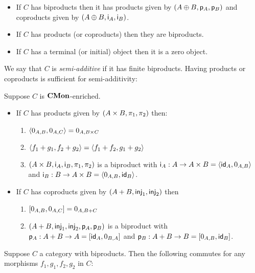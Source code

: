 \begin{proposition}
\item
\begin{itemize}
\item If $C$ has biproducts then it has products given by $(A \oplus B, \mathsf{p}_A, \mathsf{p}_B)$ and coproducts
given by $(A \oplus B, \mathsf{i}_A, \mathsf{i}_B)$.
\item If $C$ has products (or coproducts) then they are biproducts.
\item If $C$ has a terminal (or initial) object then it is a zero object.
\end{itemize}
\end{proposition}

\noindent We say that $C$ is \emph{semi-additive} if it has finite biproducts. Having products or coproducts
is sufficient for semi-additivity:

\begin{proposition}
Suppose $C$ is $\mathbf{CMon}$-enriched.
\begin{itemize}
\item If $C$ has products given by $(A \times B, \pi_1, \pi_2)$ then:
\begin{enumerate}
\item $\langle 0_{A,B}, 0_{A,C}\rangle = 0_{A,B \times C}$
\item $\langle f_1 + g_1, f_2 + g_2\rangle = \langle f_1 + f_2, g_1 + g_2\rangle$
\item $(A \times B, \mathsf{i}_A, \mathsf{i}_B, \pi_1, \pi_2)$ is a
biproduct with $\mathsf{i}_A: A \to A \times B = \langle \mathsf{id}_A, 0_{A,B}\rangle$ and $\mathsf{i}_B: B \to A \times B =
\langle 0_{A,B}, \mathsf{id}_B\rangle$.
\end{enumerate}
\item If $C$ has coproducts given by $(A + B, \mathsf{inj}_1, \mathsf{inj}_2)$ then
\begin{enumerate}
\item $[0_{A,B}, 0_{A,C}] = 0_{A,B + C}$
\item $(A + B, \mathsf{inj}_1, \mathsf{inj}_2, \mathsf{p}_A, \mathsf{p}_B)$ is a
biproduct with $\mathsf{p}_A: A + B \to A = [\mathsf{id}_A, 0_{B,A}]$ and $\mathsf{p}_B: A + B \to B =
[0_{A,B}, \mathsf{id}_B]$.
\end{enumerate}
\end{itemize}
\end{proposition}

\begin{proposition}
\label{prop:biproduct:prod-coprod}
Suppose $C$ a category with biproducts. Then the following commutes for any morphisms $f_1, g_1, f_2,
g_2$ in $C$:

\begin{center}
\end{center}
\end{proposition}
